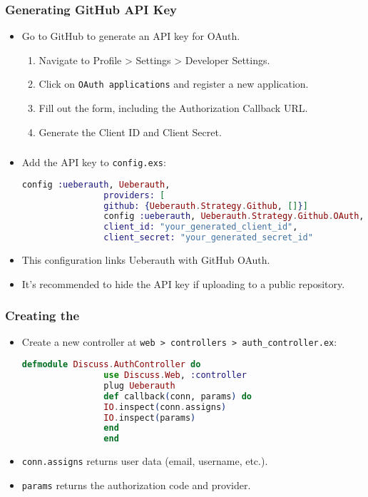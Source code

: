 \documentclass[aspectratio=169, table]{beamer}
\begin{document}
	\begin{frame}
		\frametitle{Generating GitHub API Key}
		\begin{itemize}
			\item Go to GitHub to generate an API key for OAuth.
			\begin{enumerate}
				\item Navigate to Profile > Settings > Developer Settings.
				\item Click on \texttt{OAuth applications} and register a new application.
				\item Fill out the form, including the Authorization Callback URL.
				\item Generate the Client ID and Client Secret.
			\end{enumerate}
		\end{itemize}
	\end{frame}
	
	\begin{frame}[fragile]
		\frametitle{}
		\begin{itemize}
			\item Add the API key to \texttt{config.exs}:
			\begin{lstlisting}[language=Elixir]
				config :ueberauth, Ueberauth,
				providers: [
				github: {Ueberauth.Strategy.Github, []}]
				config :ueberauth, Ueberauth.Strategy.Github.OAuth,
				client_id: "your_generated_client_id",
				client_secret: "your_generated_secret_id"
			\end{lstlisting}
			\item This configuration links Ueberauth with GitHub OAuth.
			\item It's recommended to hide the API key if uploading to a public repository.
		\end{itemize}
	\end{frame}
	
	\begin{frame}[fragile]
		\frametitle{Creating the }
		\begin{itemize}
			\item Create a new controller at \texttt{web > controllers > auth\_controller.ex}:
			\begin{lstlisting}[language=Elixir]
				defmodule Discuss.AuthController do
				use Discuss.Web, :controller
				plug Ueberauth
				def callback(conn, params) do
				IO.inspect(conn.assigns)
				IO.inspect(params)
				end
				end
			\end{lstlisting}
			\item \texttt{conn.assigns} returns user data (email, username, etc.).
			\item \texttt{params} returns the authorization code and provider.
		\end{itemize}
	\end{frame}
	
\end{document}
